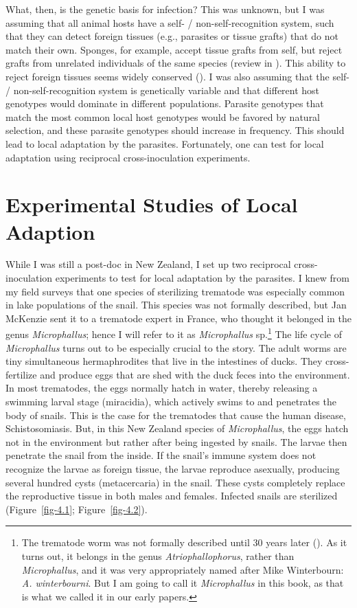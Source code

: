 \documentclass[
  letterpaper,
]{book}
\begin{document}
What, then, is the genetic basis for infection? This was unknown, but I
was assuming that all animal hosts have a self- / non-self-recognition
system, such that they can detect foreign tissues (e.g., parasites or
tissue grafts) that do not match their own. Sponges, for example, accept
tissue grafts from self, but reject grafts from unrelated individuals of
the same species (review in ). This ability to reject foreign tissues seems widely
conserved (). I was also assuming
that the self- / non-self-recognition system is genetically variable and
that different host genotypes would dominate in different populations.
Parasite genotypes that match the most common local host genotypes would
be favored by natural selection, and these parasite genotypes should
increase in frequency. This should lead to local adaptation by the
parasites. Fortunately, one can test for local adaptation using
reciprocal cross-inoculation experiments.

\section{Experimental Studies of Local
Adaption}\label{experimental-studies-of-local-adaption}

While I was still a post-doc in New Zealand, I set up two reciprocal
cross-inoculation experiments to test for local adaptation by the
parasites. I knew from my field surveys that one species of sterilizing
trematode was especially common in lake populations of the snail. This
species was not formally described, but Jan McKenzie sent it to a
trematode expert in France, who thought it belonged in the genus
\emph{Microphallus}; hence I will refer to it as \emph{Microphallus}
sp.\footnote{The trematode worm was not formally described until 30
  years later (). As it turns out, it belongs in the genus
  \emph{Atriophallophorus}, rather than \emph{Microphallus}, and it was
  very appropriately named after Mike Winterbourn: \emph{A.
  winterbourni}. But I am going to call it \emph{Microphallus} in this
  book, as that is what we called it in our early papers.} The life
cycle of \emph{Microphallus} turns out to be especially crucial to the
story. The adult worms are tiny simultaneous hermaphrodites that live in
the intestines of ducks. They cross-fertilize and produce eggs that are
shed with the duck feces into the environment. In most trematodes, the
eggs normally hatch in water, thereby releasing a swimming larval stage
(miracidia), which actively swims to and penetrates the body of snails.
This is the case for the trematodes that cause the human disease,
Schistosomiasis. But, in this New Zealand species of
\emph{Microphallus}, the eggs hatch not in the environment but rather
after being ingested by snails. The larvae then penetrate the snail from
the inside. If the snail's immune system does not recognize the larvae
as foreign tissue, the larvae reproduce asexually, producing several
hundred cysts (metacercaria) in the snail. These cysts completely
replace the reproductive tissue in both males and females. Infected
snails are sterilized (Figure~\ref{fig-4.1}; Figure~\ref{fig-4.2}).
\end{document}

